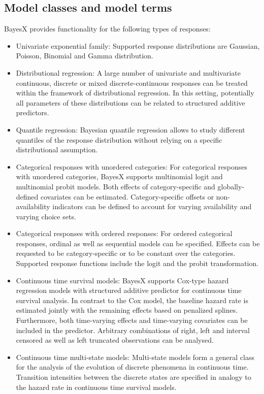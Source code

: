 \subsection{Model classes and model terms}

BayesX provides functionality for the following types of responses:
\begin{itemize}
 \item Univariate exponential family: Supported response distributions are Gaussian, Poisson, Binomial and Gamma distribution.
 \item Distributional regression: A large number of univariate and multivariate continuous, discrete or mixed discrete-continuous responses can be treated within the framework of distributional regression. In this setting, potentially all parameters of these distributions can be related to structured additive predictors.
 \item Quantile regression: Bayesian quantile regression allows to study different quantiles of the response distribution without relying on a specific distributional assumption.
 \item Categorical responses with unordered categories: For categorical responses with unordered categories, BayesX supports multinomial logit and multinomial probit models. Both effects of category-specific and globally-defined covariates can be estimated. Category-specific offsets or non-availability indicators can be defined to account for varying availability and varying choice sets.
 \item Categorical responses with ordered responses: For ordered categorical responses, ordinal as well as sequential models can be specified. Effects can be requested to be category-specific or to be constant over the categories. Supported response functions include the logit and the probit transformation.
 \item Continuous time survival models: BayesX supports Cox-type hazard regression models with structured additive predictor for continuous time survival analysis. In contrast to the Cox model, the baseline hazard rate is estimated jointly with the remaining effects based on penalized splines. Furthermore, both time-varying effects and time-varying covariates can be included in the predictor. Arbitrary combinations of right, left and interval censored as well as left truncated observations can be analysed.
 \item Continuous time multi-state models: Multi-state models form a general class for the analysis of the evolution of discrete phenomena in continuous time. Transition intensities between the discrete states are specified in analogy to the hazard rate in continuous time survival models.
\end{itemize}

